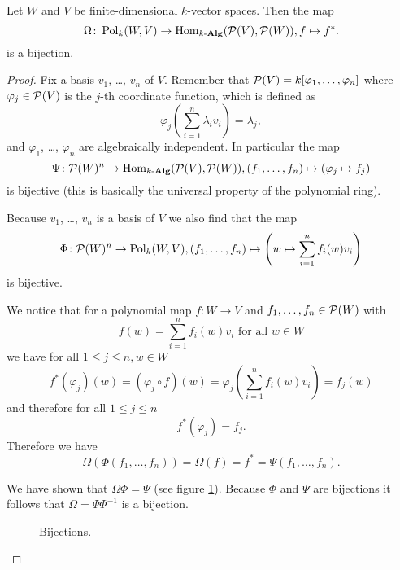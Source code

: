 \begin{prop}
 Let $W$ and $V$ be finite-dimensional $k$-vector spaces. Then the map
 \[
  \Omega \colon \operatorname{Pol}_k(W,V) \to \operatorname{Hom}_{k\text{-}\mathbf{Alg}}(\mathcal{P}(V), \mathcal{P}(W)), f \mapsto f^*.
 \]
 is a bijection.
\end{prop}
\begin{proof}
 Fix a basis $v_1$, \dots, $v_n$ of $V$. Remember that $\mathcal{P}(V) = k[\varphi_1, \dotsc, \varphi_n]$ where $\varphi_j \in \mathcal{P}(V)$ is the $j$-th coordinate function, which is defined as
 \[
  \varphi_j\left(\sum_{i=1}^n \lambda_i v_i\right) = \lambda_j,
\]
 and $\varphi_1$, \dots, $\varphi_n$ are algebraically independent. In particular the map
 \[
  \Psi \colon \mathcal{P}(W)^n \to \operatorname{Hom}_{k\text{-}\mathbf{Alg}}(\mathcal{P}(V),\mathcal{P}(W)), (f_1, \dotsc, f_n) \mapsto (\varphi_j \mapsto f_j)
 \]
 is bijective (this is basically the universal property of the polynomial ring).
 
 Because $v_1$, \dots, $v_n$ is a basis of $V$ we also find that the map
 \[
  \Phi \colon \mathcal{P}(W)^n \to \operatorname{Pol}_k(W,V), (f_1, \dotsc, f_n) \mapsto \left(w \mapsto \sum_{i=1}^n f_i(w)v_i\right)
 \]
 is bijective.
 
 We notice that for a polynomial map $f \colon W \to V$ and $f_1, \dotsc, f_n \in \mathcal{P}(W)$ with
 \[
  f(w) = \sum_{i=1}^n f_i(w) v_i \text{ for all } w \in W
 \]
 we have for all $1 \leq j \leq n, w \in W$
 \[
  f^*(\varphi_j)(w)
  = (\varphi_j \circ f)(w)
  = \varphi_j\left(\sum_{i=1}^n f_i(w) v_i\right)
  = f_j(w)
 \]
 and therefore for all $1 \leq j \leq n$
 \[
  f^*(\varphi_j) = f_j.
 \]
 Therefore we have
 \[
  \Omega(\Phi(f_1, \dotsc, f_n)) = \Omega(f) = f^* = \Psi(f_1, \dotsc, f_n).
 \]
 
 We have shown that $\Omega \Phi = \Psi$ (see figure \ref{fig: bijections}). Because $\Phi$ and $\Psi$ are bijections it follows that $\Omega = \Psi \Phi^{-1}$ is a bijection. \qedhere
 
 \begin{figure}\centering
  \caption{Bijections.}
  \label{fig: bijections}
 \end{figure}
\end{proof}





